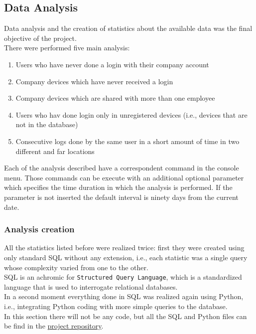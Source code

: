 \documentclass[12pt, a4paper, oneside]{article}
\begin{document}
\subsection{Data Analysis}
Data analysis and the creation of statistics about the available data was the final objective of the project.\\
There were performed five main analysis:
\begin{enumerate}
    \item Users who have never done a login with their company account
    \item Company devices which have never received a login
    \item Company devices which are shared with more than one employee
    \item Users who hav done login only in unregistered devices (i.e., devices that are not in the database)
    \item Consecutive logs done by the same user in a short amount of time in two different and far locations 
\end{enumerate}
\newpage
Each of the analysis described have a correspondent command in the console menu. Those commands can be execute with an additional optional parameter which specifies the time duration in which the analysis is performed.
If the parameter is not inserted the default interval is ninety days from the current date. 

\subsubsection{Analysis creation}
All the statistics listed before were realized twice: first they were created using only standard SQL without any extension, i.e., each statistic was a single query whose complexity varied from one to the other.\\
SQL is an achromic for \texttt{Structured Query Language}, which is a standardized language that is used to interrogate relational databases.\\
In a second moment everything done in SQL was realized again using Python, i.e., integrating Python coding with more simple queries to the database.\\
In this section there will not be any code, but all the SQL and Python files can be find in the \href{https://github.com/MadMatti/data-mining-internship-project}{project repository}.
\end{document}
